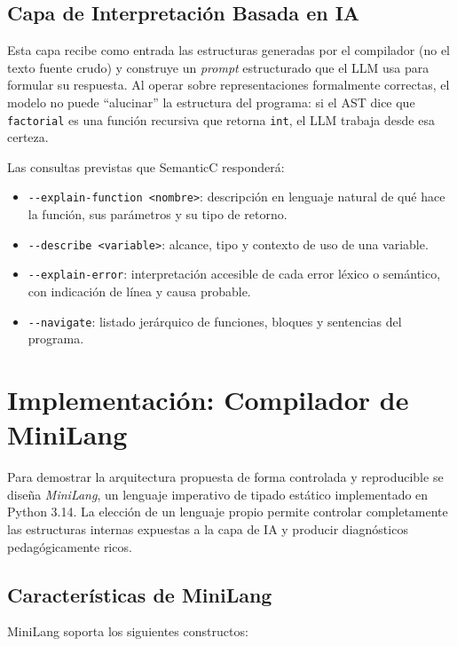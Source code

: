 \documentclass[conference]{IEEEtran}
\begin{document}
\subsection{Capa de Interpretación Basada en IA}

Esta capa recibe como entrada las estructuras generadas por el compilador (no el texto fuente crudo) y construye un \textit{prompt} estructurado que el LLM usa para formular su respuesta. Al operar sobre representaciones formalmente correctas, el modelo no puede ``alucinar'' la estructura del programa: si el AST dice que \texttt{factorial} es una función recursiva que retorna \texttt{int}, el LLM trabaja desde esa certeza.

Las consultas previstas que SemanticC responderá:

\begin{itemize}
    \item \texttt{-{}-explain-function <nombre>}: descripción en lenguaje natural de qué hace la función, sus parámetros y su tipo de retorno.
    \item \texttt{-{}-describe <variable>}: alcance, tipo y contexto de uso de una variable.
    \item \texttt{-{}-explain-error}: interpretación accesible de cada error léxico o semántico, con indicación de línea y causa probable.
    \item \texttt{-{}-navigate}: listado jerárquico de funciones, bloques y sentencias del programa.
\end{itemize}

\section{Implementación: Compilador de MiniLang}

Para demostrar la arquitectura propuesta de forma controlada y reproducible se diseña \textit{MiniLang}, un lenguaje imperativo de tipado estático implementado en Python 3.14. La elección de un lenguaje propio permite controlar completamente las estructuras internas expuestas a la capa de IA y producir diagnósticos pedagógicamente ricos.

\subsection{Características de MiniLang}

MiniLang soporta los siguientes constructos:
\end{document}
